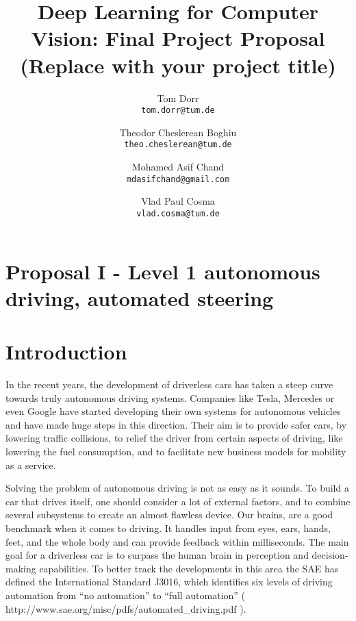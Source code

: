 \documentclass[10pt,twocolumn,letterpaper]{article}
\begin{document}
\title{Deep Learning for Computer Vision: Final Project Proposal\\(Replace with your project title)}

\author{Tom Dorr\\
{\tt\small tom.dorr@tum.de}
\and
Theodor Cheslerean Boghiu\\
{\tt\small theo.cheslerean@tum.de}
\and
Mohamed Asif Chand\\
{\tt\small mdasifchand@gmail.com}
\and
Vlad Paul Cosma\\
{\tt\small vlad.cosma@tum.de}
}

\maketitle

%
%
\section*{Proposal I - Level 1 autonomous driving, automated steering}
\section{Introduction}
In the recent years, the development of driverless cars has taken a steep curve towards truly autonomous driving systems. Companies like Tesla, Mercedes or even Google have started developing their own systems for autonomous vehicles and have made huge steps in this direction. Their aim is to provide safer cars, by lowering traffic collisions, to relief the driver from certain aspects of driving, like lowering the fuel consumption, and to facilitate new business models for mobility as a service. 

Solving the problem of autonomous driving is not as easy as it sounds. To build a car that drives itself, one should consider a lot of external factors, and to combine several subsystems to create an almost flawless device. Our brains, are a good benchmark when it comes to driving. It handles input from eyes, ears, hands, feet, and the whole body and can provide feedback within milliseconds. The main goal for a driverless car is to surpass the human brain in perception and decision-making capabilities. To better track the developments in this area the SAE has defined the International Standard J3016, which identifies six levels of driving automation from “no automation” to “full automation” ( http://www.sae.org/misc/pdfs/automated_driving.pdf ). 
\end{document}

